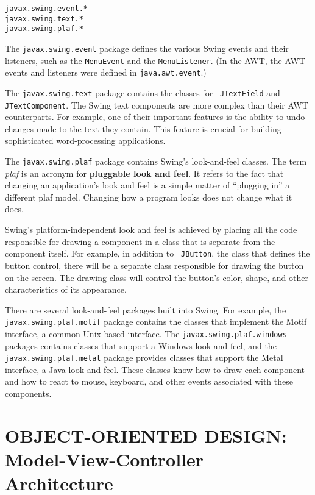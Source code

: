 \begin{jjjlisting}
\begin{lstlisting}
javax.swing.event.*
javax.swing.text.*
javax.swing.plaf.*
\end{lstlisting}
\end{jjjlisting}

\noindent The {\tt javax.swing.event} package defines the
various Swing events and their listeners, such as the {\tt MenuEvent}
and the {\tt MenuListener}.  (In the AWT, the AWT events and
listeners were defined in {\tt java.awt.event}.)

The {\tt javax.swing.text} package contains the classes for {\tt
JTextField} and {\tt JTextComponent}.  The Swing text components are
more complex than their AWT counterparts.  For example, one of their
important features is the ability to undo changes made to the text
they contain.  This feature is crucial for building sophisticated
word-processing applications.

The {\tt javax.swing.plaf} package contains Swing's look-and-feel
classes.  The term {\it plaf} is an acronym for {\bf pluggable
look and feel}. It refers to the fact that changing an application's
look and feel is a simple matter of ``plugging in'' a different plaf
model.  Changing how a program looks does not change what it does.

Swing's platform-independent look and feel is achieved by placing all
the code responsible for drawing a component in a class that is
separate from the component itself.  For example, in addition to {\tt
JButton}, the class that defines the button control, there will be a
separate class responsible for drawing the button on the screen.  The
drawing class will control the button's color, shape, and other
characteristics of its appearance.

There are several look-and-feel packages built into Swing.  For
example, the {\tt javax.swing.plaf.motif} package contains the classes
that implement the Motif interface, a common Unix-based interface.
The {\tt javax.swing.plaf.windows} packages contains classes that
support a Windows look and feel, and the {\tt javax.swing.plaf.metal}
package provides classes that support the Metal interface, a Java look
and feel. These classes know how to draw each component and how to
react to mouse, keyboard, and other events associated with these
components.  


\section{OBJECT-ORIENTED DESIGN:  \\Model-View-Controller Architecture}


